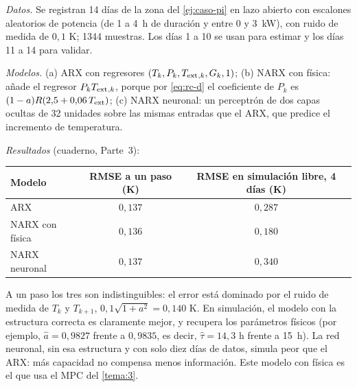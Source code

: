 \begin{ejemplo}\label{ej:caso-id}
\emph{Datos.} Se registran 14 días de la zona del \cref{ej:caso-pi} en lazo abierto con escalones aleatorios de potencia (de 1 a 4~h de duración y entre 0 y 3~kW), con ruido de medida de $0{,}1$ K; 1344 muestras. Los días 1 a 10 se usan para estimar y los días 11 a 14 para validar.

\emph{Modelos.} (a) ARX con regresores $(T_k,P_k,T_{\mathrm{ext}}{}_{,k},G_k,1)$; (b) NARX con física: añade el regresor $P_kT_{\mathrm{ext}}{}_{,k}$, porque por \eqref{eq:rc-d} el coeficiente de $P_k$ es $(1-a)R(2{,}5+0{,}06\,T_{\mathrm{ext}})$; (c) NARX neuronal: un perceptrón de dos capas ocultas de 32 unidades sobre las mismas entradas que el ARX, que predice el incremento de temperatura.

\emph{Resultados} (cuaderno, Parte~3):
\begin{center}\small
\begin{tabular}{@{}lcc@{}}
\toprule
Modelo & RMSE a un paso (K) & RMSE en simulación libre, 4 días (K) \\
\midrule
ARX & $0{,}137$ & $0{,}287$ \\
NARX con física & $0{,}136$ & $0{,}180$ \\
NARX neuronal & $0{,}137$ & $0{,}340$ \\
\bottomrule
\end{tabular}
\end{center}
A un paso los tres son indistinguibles: el error está dominado por el ruido de medida de $T_k$ y $T_{k+1}$, $0{,}1\sqrt{1+a^{2}}=0{,}140$ K. En simulación, el modelo con la estructura correcta es claramente mejor, y recupera los parámetros físicos (por ejemplo, $\hat a=0{,}9827$ frente a $0{,}9835$, es decir, $\hat\tau=14{,}3$ h frente a 15~h). La red neuronal, sin esa estructura y con solo diez días de datos, simula peor que el ARX: más capacidad no compensa menos información. Este modelo con física es el que usa el MPC del \cref{tema:3}.
\end{ejemplo}

